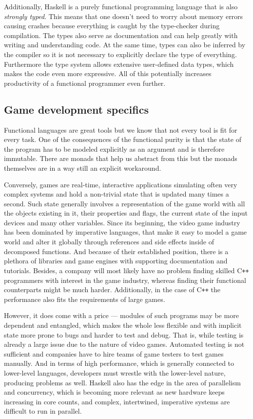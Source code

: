 \documentclass[
  digital, %
  color,   %
  table,   %
  oneside, %
  lof,     %
  lot,     %
]{fithesis3}
\newcommand{\cpp}{C\nolinebreak\texttt{+}\nolinebreak\texttt{+}}
\begin{document}
Additionally, Haskell is a purely functional programming language that
is also \emph{strongly typed}. This means that one
doesn't need to worry about memory errors causing crashes because
everything is caught by the type-checker during compilation.
The types also serve as documentation and can help greatly
with writing and understanding code. At the same time,
types can also be inferred by the compiler so it
is not necessary to explicitly declare the type of everything.
Furthermore the type system allows extensive user-defined data types,
which makes the code even more expressive.
All of this potentially increases productivity of a functional programmer even further.


\subsection{Game development specifics}
Functional languages are great tools but we know that not every tool is
fit for every task. One of the consequences of the functional purity is
that the state of the program has to be modeled explicitly as an argument
and is therefore immutable. There are monads that help us abstract
from this but the monads themselves are in a way still an explicit workaround.

Conversely, games are real-time, interactive applications simulating
often very complex systems and hold a non-trivial state that is
updated many times a second. Such state generally involves a representation
of the game world with all the objects existing in it, their properties and flags,
the current state of the input devices and many other variables. Since its beginning,
the video game industry has been dominated by imperative languages,
that make it easy to model a game world and alter it globally through
references and side effects inside of decomposed functions. And because
of their established position, there is a plethora of libraries and game engines
with supporting documentation and tutorials. Besides, a company will most likely
have no problem finding skilled \cpp{} programmers with interest
in the game industry, whereas finding their functional counterparts
might be much harder. Additionally, in the case of \cpp{} the performance
also fits the requirements of large games.

However, it does come with a price --- modules of such programs may be
more dependent and entangled, which makes the whole less flexible and with
implicit state more prone to bugs and harder to test and debug.
That is, while testing is already a large issue due to the nature of video games.
Automated testing is not sufficient and companies have to hire teams
of game testers to test games manually. And in terms of high performance,
which is generally connected to lower-level languages, developers must
wrestle with the lower-level nature, producing problems as well.
Haskell also has the edge in the area of parallelism and concurrency,
which is becoming more relevant as new hardware keeps increasing in core counts,
and complex, intertwined, imperative systems are difficult to run in parallel.
\end{document}
